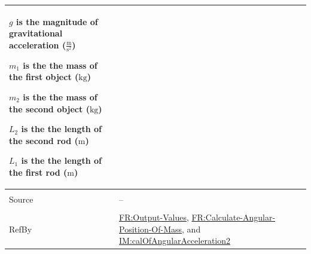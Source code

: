 \documentclass[12pt]{article}
\begin{document}
\begin{minipage}{\textwidth}
\begin{tabular}{>{\raggedright}p{}>{\raggedright\arraybackslash}p{}}
\begin{symbDescription}
              \item{$g$ is the magnitude of gravitational acceleration ($\frac{\text{m}}{\text{s}^{2}}$)}
              \item{${m_{1}}$ is the the mass of the first object (${\text{kg}}$)}
              \item{${m_{2}}$ is the the mass of the second object (${\text{kg}}$)}
              \item{${L_{2}}$ is the the length of the second rod (${\text{m}}$)}
              \item{${L_{1}}$ is the the length of the first rod (${\text{m}}$)}
              \end{symbDescription}
\\ \midrule \\
Source & --
         
\\ \midrule \\
RefBy & \hyperref[outputValues]{FR:Output-Values}, \hyperref[calcAngPos]{FR:Calculate-Angular-Position-Of-Mass}, and \hyperref[IM:calOfAngularAcceleration2]{IM:calOfAngularAcceleration2}
        
\\ \bottomrule
\end{tabular}
\end{minipage}
\end{document}
